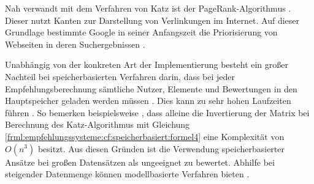 
Nah verwandt mit dem Verfahren von Katz ist der PageRank-Algorithmus \cite[S. 1]{was:2018}. Dieser nutzt Kanten zur Darstellung von Verlinkungen im Internet. Auf dieser Grundlage bestimmte Google in seiner Anfangszeit die Priorisierung von Webseiten in deren Suchergebnissen \cite[S. 3ff.]{page:1999}.

Unabhängig von der konkreten Art der Implementierung besteht ein großer Nachteil bei speicherbasierten Verfahren darin, dass bei jeder Empfehlungsberechnung sämtliche Nutzer, Elemente und Bewertungen in den Hauptspeicher geladen werden müssen \cite[S. 8]{yang:2016}. Dies kann zu sehr hohen Laufzeiten führen \cite[S. 2]{zhang:2010}. So bemerken beispielsweise \textcite[S. 3]{landherr:2010}, dass alleine die Invertierung der Matrix bei Berechnung des Katz-Algorithmus mit Gleichung \ref{frml:empfehlungssysteme:cf:speicherbasiert:formel4} eine Komplexität von $O(n^3)$ besitzt. Aus diesen Gründen ist die Verwendung speicherbasierter Ansätze bei großen Datensätzen als ungeeignet zu bewertet. Abhilfe bei steigender Datenmenge können modellbasierte Verfahren bieten \cite[S. 8]{yang:2016}.

